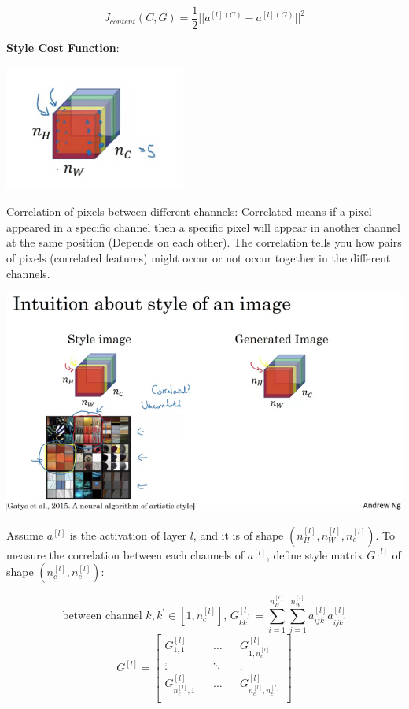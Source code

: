 \documentclass{article}
\begin{document}
\[J_{content}(C, G) = \frac{1}{2} ||a^{[l](C)} - a^{[l](G)}||^{2}\]

\noindent \textbf{Style Cost Function}:

\begin{center}
\includegraphics[scale=0.4]{./images/correlation.png}
\end{center}

\noindent Correlation of pixels between different channels: Correlated means if a pixel appeared in a specific channel then a specific pixel will appear in another channel at the same position (Depends on each other). The correlation tells you how pairs of pixels (correlated features) might occur or not occur together in the different channels.

\begin{center}
\includegraphics[scale=0.4]{./images/correlation_style.png}
\end{center}

\noindent Assume \(a^{[l]}\) is the activation of layer \(l\), and it is of shape \((n_{H}^{[l]}, n_{W}^{[l]}, n_{c}^{[l]})\). To measure the correlation between each channels of \(a^{[l]}\), define style matrix \(G^{[l]}\) of shape \((n_{c}^{[l]}, n_{c}^{[l]})\):

\[\text{between channel \(k, k^{'} \in [1, n_{c}^{[l]}]\), } G_{kk^{'}}^{[l]} = \sum_{i = 1}^{n_{H}^{[l]}} \sum_{j = 1}^{n_{W}^{[l]}} a_{ijk}^{[l]} a_{ijk^{'}}^{[l]}\]
\[
G^{[l]} =
\begin{bmatrix}
G_{1, 1}^{[l]} && \dots && G_{1, n_{c}^{[l]}}^{[l]} \\
\vdots && \ddots && \vdots \\
G_{n_{c}^{[l]}, 1}^{[l]} && \dots && G_{n_{c}^{[l]}, n_{c}^{[l]}}^{[l]} \\
\end{bmatrix}
\]
\end{document}
